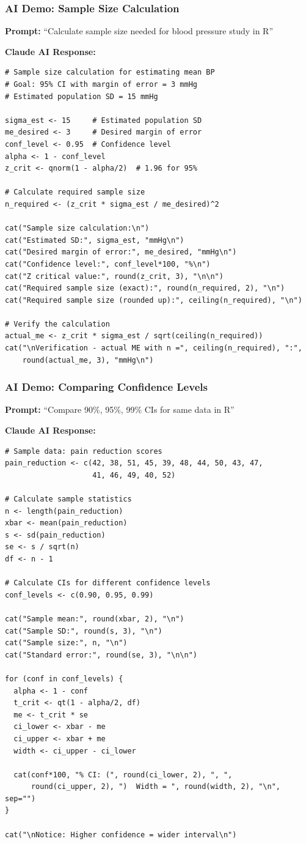 \documentclass{beamer}
\begin{document}
\begin{frame}[fragile]
\frametitle{AI Demo: Sample Size Calculation}
\textbf{Prompt:} ``Calculate sample size needed for blood pressure study in R''

\vspace{0.2cm}
\textbf{Claude AI Response:}
\tiny
\begin{verbatim}
# Sample size calculation for estimating mean BP
# Goal: 95% CI with margin of error = 3 mmHg
# Estimated population SD = 15 mmHg

sigma_est <- 15     # Estimated population SD
me_desired <- 3     # Desired margin of error
conf_level <- 0.95  # Confidence level
alpha <- 1 - conf_level
z_crit <- qnorm(1 - alpha/2)  # 1.96 for 95%

# Calculate required sample size
n_required <- (z_crit * sigma_est / me_desired)^2

cat("Sample size calculation:\n")
cat("Estimated SD:", sigma_est, "mmHg\n")
cat("Desired margin of error:", me_desired, "mmHg\n")
cat("Confidence level:", conf_level*100, "%\n")
cat("Z critical value:", round(z_crit, 3), "\n\n")
cat("Required sample size (exact):", round(n_required, 2), "\n")
cat("Required sample size (rounded up):", ceiling(n_required), "\n")

# Verify the calculation
actual_me <- z_crit * sigma_est / sqrt(ceiling(n_required))
cat("\nVerification - actual ME with n =", ceiling(n_required), ":",
    round(actual_me, 3), "mmHg\n")
\end{verbatim}
\end{frame}

\begin{frame}[fragile]
\frametitle{AI Demo: Comparing Confidence Levels}
\textbf{Prompt:} ``Compare 90\%, 95\%, 99\% CIs for same data in R''

\vspace{0.2cm}
\textbf{Claude AI Response:}
\tiny
\begin{verbatim}
# Sample data: pain reduction scores
pain_reduction <- c(42, 38, 51, 45, 39, 48, 44, 50, 43, 47,
                    41, 46, 49, 40, 52)

# Calculate sample statistics
n <- length(pain_reduction)
xbar <- mean(pain_reduction)
s <- sd(pain_reduction)
se <- s / sqrt(n)
df <- n - 1

# Calculate CIs for different confidence levels
conf_levels <- c(0.90, 0.95, 0.99)

cat("Sample mean:", round(xbar, 2), "\n")
cat("Sample SD:", round(s, 3), "\n")
cat("Sample size:", n, "\n")
cat("Standard error:", round(se, 3), "\n\n")

for (conf in conf_levels) {
  alpha <- 1 - conf
  t_crit <- qt(1 - alpha/2, df)
  me <- t_crit * se
  ci_lower <- xbar - me
  ci_upper <- xbar + me
  width <- ci_upper - ci_lower

  cat(conf*100, "% CI: (", round(ci_lower, 2), ", ",
      round(ci_upper, 2), ")  Width = ", round(width, 2), "\n", sep="")
}

cat("\nNotice: Higher confidence = wider interval\n")
\end{verbatim}
\end{frame}
\end{document}
